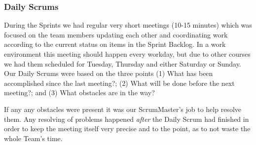 \subsubsection{Daily Scrums}
During the Sprints we had regular very short meetings (10-15 minutes) which was focused on the team members updating each other and coordinating work according to the current status on items in the Sprint Backlog. In a work environment this meeting should happen every workday, but due to other courses we had them scheduled for Tuesday, Thursday and either Saturday or Sunday. Our Daily Scrums were based on the three points (1) What has been accomplished since the last meeting?; (2) What will be done before the next meeting?; and (3) What obstacles are in the way?

If any any obstacles were present it was our ScrumMaster's job to help resolve them. Any resolving of problems happened \emph{after} the Daily Scrum had finished in order to keep the meeting itself very precise and to the point, as to not waste the whole Team's time.